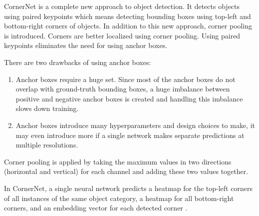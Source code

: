 \documentclass{article}
\begin{document}
\setlength{\parindent}{6ex}

\indent

CornerNet \cite{cornernetcite} is a complete new approach to object detection. It detects objects using 
paired keypoints which means detecting bounding boxes using top-left and bottom-right 
corners of objects. In addition to this new approach, corner pooling is introduced. 
Corners are better localized using corner pooling. Using paired keypoints eliminates 
the need for using anchor boxes. \par

There are two drawbacks of using anchor boxes: 
\begin{enumerate}
    \item Anchor boxes require a huge set. Since most of the anchor boxes do not 
    overlap with ground-truth bounding boxes, a huge imbalance between positive and 
    negative anchor boxes is created and handling this imbalance slows down training.
    \item Anchor boxes introduce many hyperparameters and design choices to make, 
    it may even introduce more if a single network makes separate predictions at 
    multiple resolutions.
\end{enumerate}
\indent

Corner pooling is applied by taking the maximum values in two directions (horizontal 
and vertical) for each channel and adding these two values together. \par

In CornerNet, a single neural network predicts a heatmap for the top-left corners 
of all instances of the same object category, a heatmap for all bottom-right 
corners, and an embedding vector for each detected corner \cite{cornernetcite}.
\end{document}
